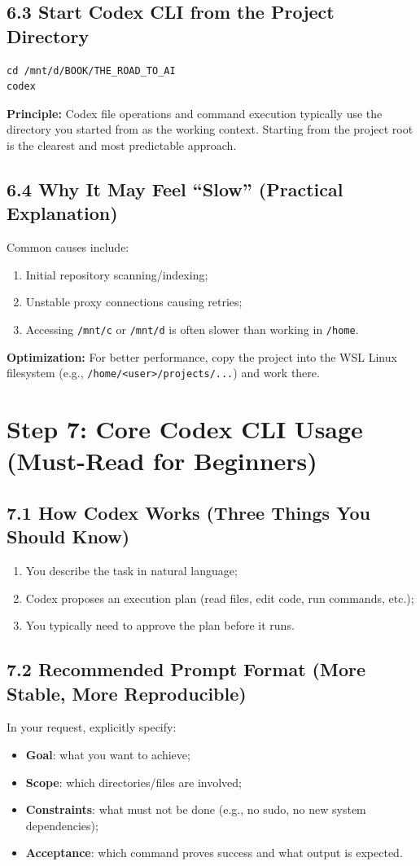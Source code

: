 \documentclass[11pt,a4paper]{article}
\begin{document}
\subsection{6.3 Start Codex CLI from the Project Directory}
\begin{lstlisting}
cd /mnt/d/BOOK/THE_ROAD_TO_AI
codex
\end{lstlisting}
\textbf{Principle:} Codex file operations and command execution typically use the directory you started from as the working context. Starting from the project root is the clearest and most predictable approach.

\subsection{6.4 Why It May Feel ``Slow'' (Practical Explanation)}
Common causes include:
\begin{enumerate}[leftmargin=1.7em]
  \item Initial repository scanning/indexing;
  \item Unstable proxy connections causing retries;
  \item Accessing \texttt{/mnt/c} or \texttt{/mnt/d} is often slower than working in \texttt{/home}.
\end{enumerate}
\textbf{Optimization:} For better performance, copy the project into the WSL Linux filesystem (e.g., \texttt{/home/<user>/projects/...}) and work there.

\section{Step 7: Core Codex CLI Usage (Must-Read for Beginners)}
\subsection{7.1 How Codex Works (Three Things You Should Know)}
\begin{enumerate}[leftmargin=1.7em]
  \item You describe the task in natural language;
  \item Codex proposes an execution plan (read files, edit code, run commands, etc.);
  \item You typically need to approve the plan before it runs.
\end{enumerate}

\subsection{7.2 Recommended Prompt Format (More Stable, More Reproducible)}
In your request, explicitly specify:
\begin{itemize}[leftmargin=1.5em]
  \item \textbf{Goal}: what you want to achieve;
  \item \textbf{Scope}: which directories/files are involved;
  \item \textbf{Constraints}: what must not be done (e.g., no sudo, no new system dependencies);
  \item \textbf{Acceptance}: which command proves success and what output is expected.
\end{itemize}
\end{document}
